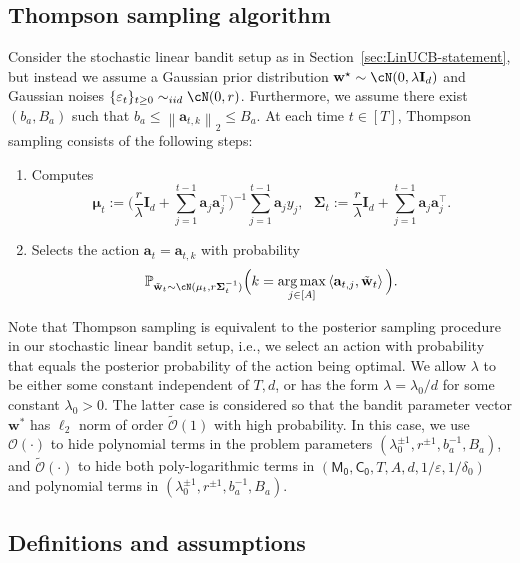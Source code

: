 \documentclass[10pt]{article}
\newcommand{\id}{\bI}
\newcommand{\eps}{\varepsilon}
\DeclareMathOperator*{\argmax}{arg\,max}
\newcommand{\norm}[1]{\left\|{#1}\right\|}
\newcommand{\ltwo}[1]{\norm{#1}_2}
\renewcommand{\cO}{\mathcal{O}}
\newcommand{\<}{\left\langle}
\renewcommand{\>}{\right\rangle}
\renewcommand{\P}{\mathbb{P}}
\newcommand{\Tpsmean}{{{\mathbf\mu}}}
\newcommand{\Tpscov}{{{\mathbf\Sigma}}}
\newcommand{\Tpssam}{{\tilde\bw}}
\newcommand{\Tpspar}{{\lambda}}
\newcommand{\Tpsparn}{{r}}
\newcommand{\tcO}{{\tilde{\mathcal O}}}
\newcommand{\totlen}{{T}}
\newcommand{\neuron}{{\mathsf{M_0}}}
\newcommand{\weightn}{{{\mathsf{C_0}}}}
\def\bI{{\mathbf I}}
\def\ba{{\mathbf a}}
\def\bw{{\mathbf w}}
\begin{document}
\subsection{Thompson sampling algorithm}\label{app:ts_algorithm_formula}
Consider the stochastic linear bandit setup as in Section~\ref{sec:LinUCB-statement}, but instead we assume a  Gaussian prior distribution $\bw^\star\sim \cN(0,\Tpspar\id_d)$ and Gaussian noises $\{ \eps_t \}_{t \ge 0} \sim_{iid} \cN(0,\Tpsparn)$. Furthermore, we assume there exist $(b_a, B_a)$ such that $b_a\leq\ltwo{\ba_{t,k}}\leq B_a$. At each time $t\in[\totlen]$, Thompson sampling consists of the following steps:
\begin{enumerate}
    \item Computes 
    \[
    \Tpsmean_t:= \Big(\frac{\Tpsparn}{\Tpspar  }\id_{d}+\sum_{j=1}^{t-1}\ba_j\ba_j^\top \Big)^{-1}\sum_{j=1}^{t-1}\ba_j y_j,~~~
\Tpscov_t:=\frac{\Tpsparn}{\Tpspar  }\id_{d}+\sum_{j=1}^{t-1}\ba_j\ba_j^\top.
\]
\item Selects the action $\ba_{t}=\ba_{t,k}$ with probability 
\[
\P_{\Tpssam_t\sim\cN(\Tpsmean_t,\Tpsparn\Tpscov_t^{-1})}\Big(k =\argmax_{j \in[A]}\<\ba_{t,j},\Tpssam_t\> \Big). 
\]
\end{enumerate}

Note that Thompson sampling is equivalent to the posterior sampling procedure in our stochastic linear bandit setup, i.e., we select an action with probability that equals  the posterior probability of the action being optimal.  We allow $\Tpspar$ to be either some constant independent of $\totlen,d$,  or has the form $\Tpspar=\Tpspar_0/d$ for some constant $\Tpspar_0>0$.  The latter case is considered so that the bandit parameter vector $\bw^*$ has $\ell_2$ norm of order  $\tcO(1)$ with high probability. In this case, we use $\cO(\cdot)$ to hide polynomial terms in the problem parameters $(\lambda_0^{\pm1},\Tpsparn^{\pm1},b_a^{-1},B_a)$, and $\tcO(\cdot)$ to hide both poly-logarithmic terms in $(\neuron,\weightn,T,A,d,1/\eps,1/\delta_0)$ and polynomial terms in  $(\lambda_0^{\pm1},\Tpsparn^{\pm1},b_a^{-1},B_a)$. 





\subsection{Definitions and assumptions}\label{app:thompson_def_ass}
\end{document}
